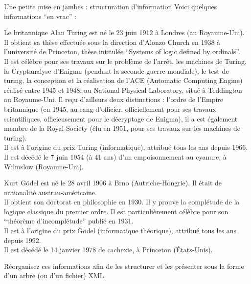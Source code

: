 \begin{frame}[allowframebreaks]{Une petite mise en jambes : structuration d'information}
Voici quelques informations ``en vrac'' :

\smallskip


\begin{footnotesize}
Le britannique Alan Turing est n\'e le  23 juin 1912 \`a Londres (au Royaume-Uni). 
 Il obtient sa th\`ese effectu\'ee sous la direction d'Alonzo Church en 1938 \`a l'universit\'e de Princeton, th\`ese intitul\'ee ``Systems of logic defined by ordinals''. \\
 Il est c\'el\`ebre pour ses travaux sur le probl\`eme de l'arr\^et, les machines de Turing, la Cryptanalyse d'Enigma (pendant la seconde guerre mondiale), le test de turing, la conception et la r\'ealisation de l'ACE (Automatic Computing Engine) r\'ealis\'e entre 1945 et 1948, au National Physical Laboratory, situ\'e \`a Teddington au Royaume-Uni. Il re\c{c}u d'ailleurs deux distinctions : l'ordre de l'Empire britannique (en 1945, au rang d'officier, officiellement pour ses travaux scientifiques, officieusement pour le d\'ecryptage de Enigma), il a est \'egalement membre de la Royal Society (\'elu en 1951, pour ses travaux sur les machines de turing).\\
 Il est \`a l'origine du prix Turing (informatique), attribu\'e tous les ans depuis 1966.\\
 Il est d\'ec\'ed\'e le 7 juin 1954 (\`a 41 ans) d'un empoisonnement au cyanure, \`a Wilmslow (Royaume-Uni).

\smallskip

 Kurt G\"odel est n\'e le 28 avril 1906 \`a Brno (Autriche-Hongrie). Il \'etait de nationalit\'e austrau-am\'ericaine.\\
 Il obtient son doctorat en philosophie en 1930. Il y prouve la compl\'etude de la logique classique du premier ordre. Il est particuli\`erement c\'el\`ebre pour son ``th\'eor\`eme d'incompl\'etude'' publi\'e en 1931.\\
 Il est \`a l'origine du prix G\"odel (informatique th\'eorique), attribu\'e tous les ans depuis 1992.\\
 Il est d\'ec\'ed\'e le 14 janvier 1978 de cachexie, \`a Princeton (\'Etats-Unis).\\
\end{footnotesize}

\begin{exoblock}
R\'eorganisez ces informations afin de les structurer et les pr\'esenter sous la forme d'un arbre (ou d'un fichier) XML.
\end{exoblock}




\end{frame}
